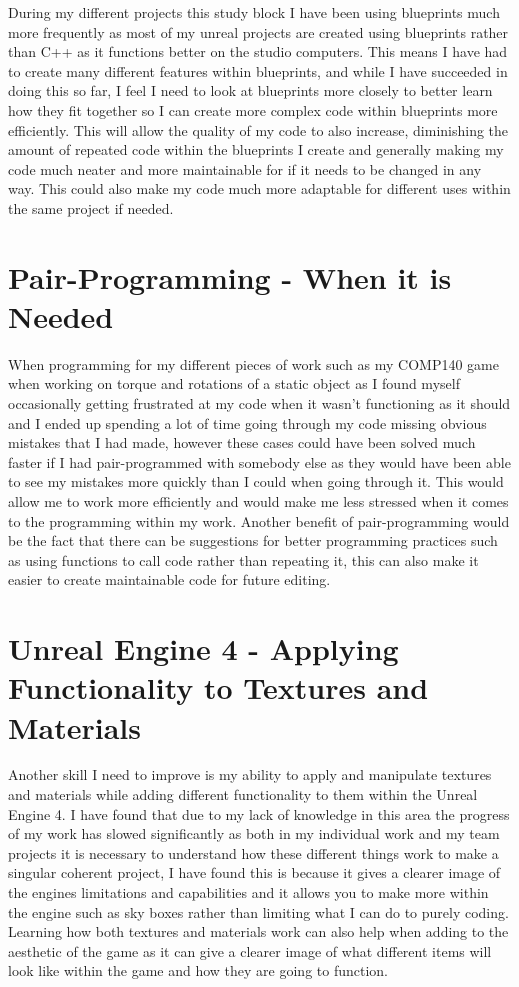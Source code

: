 \documentclass{scrartcl}
\begin{document}
During my different projects this study block I have been using blueprints much more frequently as most of my unreal projects are created using blueprints rather than C++ as it functions better on the studio computers. This means I have had to create many different features within blueprints, and while I have succeeded in doing this so far, I feel I need to look at blueprints more closely to better learn how they fit together so I can create more complex code within blueprints more efficiently. This will allow the quality of my code to also increase, diminishing the amount of repeated code within the blueprints I create and generally making my code much neater and more maintainable for if it needs to be changed in any way. This could also make my code much more adaptable for different uses within the same project if needed.

\section{Pair-Programming - When it is Needed}

When programming for my different pieces of work such as my COMP140 game when working on torque and rotations of a static object as I found myself occasionally getting frustrated at my code when it wasn’t functioning as it should and I ended up spending a lot of time going through my code missing obvious mistakes that I had made, however these cases could have been solved much faster if I had pair-programmed with somebody else as they would have been able to see my mistakes more quickly than I could when going through it. This would allow me to work more efficiently and would make me less stressed when it comes to the programming within my work. Another benefit of pair-programming would be the fact that there can be suggestions for better programming practices such as using functions to call code rather than repeating it, this can also make it easier to create maintainable code for future editing.

\section{Unreal Engine 4 - Applying Functionality to Textures and Materials}

Another skill I need to improve is my ability to apply and manipulate textures and materials while adding different functionality to them within the Unreal Engine 4. I have found that due to my lack of knowledge in this area the progress of my work has slowed significantly as both in my individual work and my team projects it is necessary to understand how these different things work to make a singular coherent project, I have found this is because it gives a clearer image of the engines limitations and capabilities and it allows you to make more within the engine such as sky boxes rather than limiting what I can do to purely coding. Learning how both textures and materials work can also help when adding to the aesthetic of the game as it can give a clearer image of what different items will look like within the game and how they are going to function.
\end{document}
